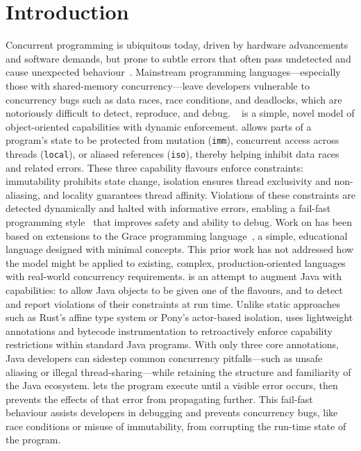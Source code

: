 \section{Introduction}
%
Concurrent programming is ubiquitous today, driven by hardware advancements and software demands, but prone to subtle errors that often pass undetected and cause unexpected behaviour~\cite{lu2008learning,musuvathi2008finding,lin2015jacontebe}. Mainstream programming languages—especially those with shared-memory concurrency—leave developers vulnerable to concurrency bugs such as data races, race conditions, and deadlocks, which are notoriously difficult to detect, reproduce, and debug.
%
\dala~\cite{Dala_Paper,DafnyExperience-Noble2024} is a simple, novel model of object-oriented capabilities with dynamic enforcement. \dala allows parts of a program’s state to be protected from mutation (\texttt{imm}), concurrent access across threads (\texttt{local}), or aliased references (\texttt{iso}), thereby helping inhibit data races and related errors. These three capability flavours enforce constraints: immutability prohibits state change, isolation ensures thread exclusivity and non-aliasing, and locality guarantees thread affinity. Violations of these constraints are detected dynamically and halted with informative errors, enabling a fail-fast programming style~\cite{shore2004fail} that improves safety and ability to debug.
%
Work on \dala has been based on extensions to the Grace programming language~\cite{GraceAbsence-Black2012}, a simple, educational language designed with minimal concepts. This prior work has not addressed how the model might be applied to existing, complex, production-oriented languages with real-world concurrency requirements.
%
\jdala is an attempt to augment Java with \dala capabilities: to allow Java objects to be given one of the \dala flavours, and to detect and report violations of their constraints at run time. Unlike static approaches such as Rust’s affine type system or Pony’s actor-based isolation, \jdala uses lightweight annotations and bytecode instrumentation to retroactively enforce capability restrictions within standard Java programs. With only three core annotations, Java developers can sidestep common concurrency pitfalls—such as unsafe aliasing or illegal thread-sharing—while retaining the structure and familiarity of the Java ecosystem.
%
%
\jdala lets the program execute until a visible error occurs, then prevents the effects of that error from propagating further. This fail-fast behaviour assists developers in debugging and prevents concurrency bugs, like race conditions or misuse of immutability, from corrupting the run-time state of the program.

